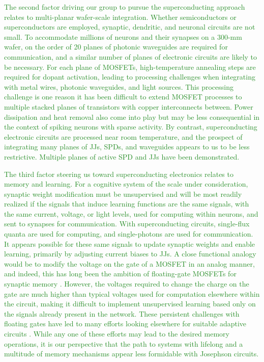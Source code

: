 \documentclass[twocolumn]{article}
\begin{document}
\textcolor{ForestGreen}{The second factor driving our group to pursue the superconducting approach relates to multi-planar wafer-scale integration. Whether semiconductors or superconductors are employed, synaptic, dendritic, and neuronal circuits are not small. To accommodate millions of neurons and their synapses on a 300-mm wafer, on the order of 20 planes of photonic waveguides are required for communication, and a similar number of planes of electronic circuits are likely to be necessary. For each plane of MOSFETs, high-temperature annealing steps are required for dopant activation, leading to processing challenges when integrating with metal wires, photonic waveguides, and light sources. This processing challenge is one reason it has been difficult to extend MOSFET processes to multiple stacked planes of transistors with copper interconnects between. Power dissipation and heat removal also come into play but may be less consequential in the context of spiking neurons with sparse activity. By contrast, superconducting electronic circuits are processed near room temperature, and the prospect of integrating many planes of JJs, SPDs, and waveguides appears to us to be less restrictive. Multiple planes of active SPD \cite{vema2012} and JJs \cite{} have been demonstrated.}

\textcolor{ForestGreen}{The third factor steering us toward superconducting electronics relates to memory and learning. For a cognitive system of the scale under consideration, synaptic weight modification must be unsupervised and will be most readily realized if the signals that induce learning functions are the same signals, with the same current, voltage, or light levels, used for computing within neurons, and sent to synapses for communication. With superconducting circuits, single-flux quanta are used for computing, and single-photons are used for communication. It appears possible for these same signals to update synaptic weights and enable learning, primarily by adjusting current biases to JJs. A close functional analogy would be to modify the voltage on the gate of a MOSFET in an analog manner, and indeed, this has long been the ambition of floating-gate MOSFETs for synaptic memory \cite{hama2013}. However, the voltages required to change the charge on the gate are much higher than typical voltages used for computation elsewhere within the circuit, making it difficult to implement unsupervised learning based only on the signals already present in the network. These persistent challenges with floating gates have led to many efforts looking elsewhere for suitable adaptive circuits \cite{upji2019}. While any one of these efforts may lead to the desired memory operations, it is our perspective that the path to systems with lifelong and a multitude of memory mechanisms appear less formidable with Josephson circuits.}
\end{document}

